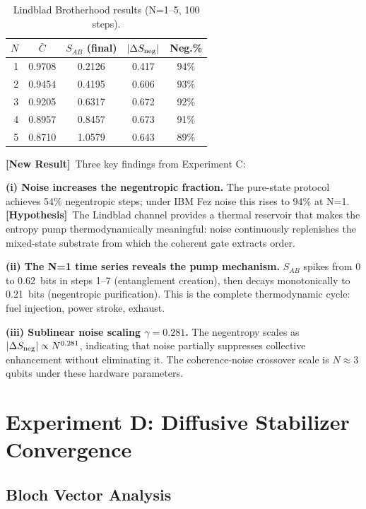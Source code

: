 \documentclass[12pt]{article}
\newcommand{\hypothesis}{\textbf{[Hypothesis]}}
\newcommand{\newresult}{\textbf{[New Result]}}
\begin{document}
\begin{table}[H]\centering
\caption{Lindblad Brotherhood results (N=1--5, 100 steps).}
\label{tab:lindblad}
\begin{tabular}{rcccc}
\toprule
$N$ & $\bar{C}$ & $S_{AB}$ (final) & $|\Delta S_{\rm neg}|$ & Neg.\%\\\midrule
1 & 0.9708 & 0.2126 & 0.417 & 94\%\\
2 & 0.9454 & 0.4195 & 0.606 & 93\%\\
3 & 0.9205 & 0.6317 & 0.672 & 92\%\\
4 & 0.8957 & 0.8457 & 0.673 & 91\%\\
5 & 0.8710 & 1.0579 & 0.643 & 89\%\\
\bottomrule
\end{tabular}
\end{table}

\newresult\ Three key findings from Experiment C:

\textbf{(i) Noise increases the negentropic fraction.}
The pure-state protocol achieves 54\% negentropic steps; under IBM Fez
noise this rises to 94\% at N=1.  \hypothesis\ The Lindblad channel
provides a thermal reservoir that makes the entropy pump thermodynamically
meaningful: noise continuously replenishes the mixed-state substrate from
which the coherent gate extracts order.

\textbf{(ii) The N=1 time series reveals the pump mechanism.}
$S_{AB}$ spikes from 0 to 0.62~bits in steps 1--7 (entanglement creation),
then decays monotonically to 0.21~bits (negentropic purification).
This is the complete thermodynamic cycle: fuel injection, power stroke, exhaust.

\textbf{(iii) Sublinear noise scaling $\gamma=0.281$.}
The negentropy scales as $|\Delta S_{\rm neg}|\propto N^{0.281}$,
indicating that noise partially suppresses collective enhancement without
eliminating it.  The coherence-noise crossover scale is $N\approx3$
qubits under these hardware parameters.

\section{Experiment D: Diffusive Stabilizer Convergence}
\label{sec:expD}

\subsection{Bloch Vector Analysis}
\end{document}
